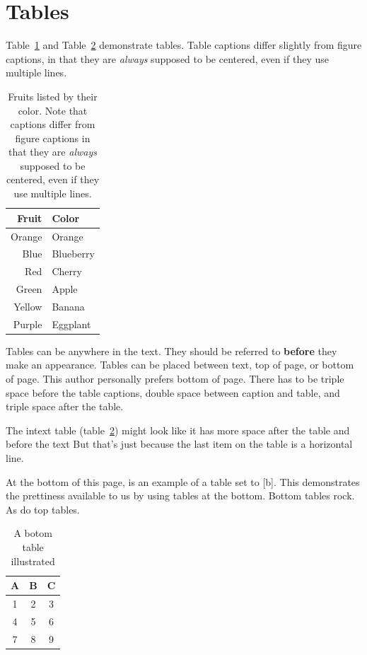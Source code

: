 \section{Tables}

Table~\ref{table_fruit} and Table~\ref{table_silly} demonstrate tables. Table
captions differ slightly from figure captions, in that they are \textit{always}
supposed to be centered, even if they use multiple lines.

\begin{table}[h]
\centering
\caption[Fruits by color]{\centering Fruits listed by their color. Note that
captions differ from figure captions in that they are \textit{always} supposed
to be centered, even if they use multiple lines.}
\label{table_fruit}
\begin{tabular}{rl}
    \hline
    Fruit & Color  \\  \hline
    Orange & Orange \\
    Blue & Blueberry \\
    Red & Cherry \\
    Green & Apple \\
    Yellow & Banana \\
    Purple & Eggplant \\
    \hline
\end{tabular}
\end{table}

Tables can be anywhere in the text. They should be referred to \textbf{before} they make an appearance. 
Tables can be placed between text, top of page, or bottom of page. This author personally prefers bottom of page. 
There has to be triple space before the table captions, double space between caption and table, and triple space after the table. 

The intext table (table~\ref{table_silly}) might look like it has more space after the table and before the text
But that's just because the last item on the table is a horizontal line. 

At the bottom of this page, is an example of a table set to [b]. This demonstrates the prettiness available to us by using tables at the bottom. 
Bottom tables rock. As do top tables. 
\begin{table}[b]
\centering
\caption[A bottom table]{A botom table illustrated}
\label{table_silly}
\begin{tabular}{ccc}
    \hline
    A & B & C \\  \hline
    1 & 2 & 3 \\
    4 & 5 & 6 \\
    7 & 8 & 9 \\
    \hline
\end{tabular}
\end{table}

